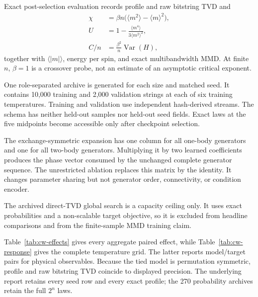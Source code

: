 Exact post-selection evaluation records profile and raw bitstring TVD and
\begin{align}
 \chi &= \beta n\bigl(\langle m^2\rangle-\langle m\rangle^2\bigr),\\
 U &= 1-\frac{\langle m^4\rangle}{3\langle m^2\rangle^2},\\
 C/n &= \frac{\beta^2}{n}\operatorname{Var}(H),
\end{align}
together with $\langle|m|\rangle$, energy per spin, and exact multibandwidth
MMD.  At finite $n$, $\beta=1$ is a crossover probe, not an estimate of an
asymptotic critical exponent.

One role-separated archive is generated for each size and matched seed.  It
contains 10,000 training and 2,000 validation strings at each of six training
temperatures.  Training and validation use independent hash-derived streams.
The schema has neither held-out samples nor held-out seed fields.  Exact laws
at the five midpoints become accessible only after checkpoint selection.

The exchange-symmetric expansion has one column for all one-body generators
and one for all two-body generators.  Multiplying it by two learned
coefficients produces the phase vector consumed by the unchanged complete
generator sequence.  The unrestricted ablation replaces this matrix by the
identity.  It changes parameter sharing but not generator order, connectivity,
or condition encoder.

The archived direct-TVD global search is a capacity ceiling only.  It uses
exact probabilities and a non-scalable target objective, so it is excluded
from headline comparisons and from the finite-sample MMD training claim.

\ifcurieweissresults
Table~\ref{tab:cw-effects} gives every aggregate paired effect, while
Table~\ref{tab:cw-response} gives the complete temperature grid.  The latter
reports model/target pairs for physical observables.  Because the tied model
is permutation symmetric, profile and raw bitstring TVD coincide to displayed
precision.  The underlying report retains every seed row and every exact
profile; the 270 probability archives retain the full $2^n$ laws.

\begin{table}[t]
\centering
\scriptsize
\caption{Curie--Weiss paired profile-TVD effects. Positive values favor the
symmetry-aligned conditioned circuit. The final column is unrestricted minus
aligned, so a negative value favors unrestricted phases. Intervals are paired
95\% bootstrap intervals over the ten matched seeds.}
\label{tab:cw-effects}
\end{table}

